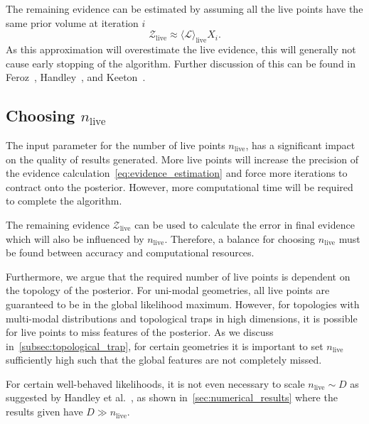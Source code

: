 \documentclass[11pt]{article}
\begin{document}
    The remaining evidence can be estimated by assuming all the live points have the same prior volume at iteration $i$
    \begin{equation}\label{eq:remaining_evidence}
    \mathcal{Z}_{\text{live}} \approx \langle \mathcal{L} \rangle_{\text{live}} X_i.
    \end{equation}
    As this approximation will overestimate the live evidence, this will generally not cause early stopping of the algorithm.
    Further discussion of this can be found in Feroz~\cite{Feroz_2009}, Handley~\cite{Handley_2015}, and
    Keeton~\cite{keeton2011statistical}.

    \subsection{Choosing $n_{\text{live}}$}\label{subsec:ns_termination}
    The input parameter for the number of live points $n_{\text{live}}$, has a significant impact on the quality of results generated.
    More live points will increase the precision of the evidence calculation~\eqref{eq:evidence_estimation} and force more
    iterations to contract onto the posterior.
    However, more computational time will be required to complete the algorithm.

    The remaining evidence $\mathcal{Z}_{\text{live}}$ can be used to calculate the error in final
    evidence~\cite{keeton2011statistical, Handley_2015} which will also be influenced by $n_{\text{live}}$.
    Therefore, a balance for choosing $n_{\text{live}}$ must be found between accuracy and computational resources.

    Furthermore, we argue that the required number of live points is dependent on the topology of the posterior.
    For uni-modal geometries, all live points are guaranteed to be in the global likelihood maximum.
    However, for topologies with multi-modal distributions and topological traps in high dimensions,
    it is possible for live points to miss features of the posterior.
    As we discuss in~\cref{subsec:topological_trap}, for certain geometries it is important to
    set $n_{\text{live}}$ sufficiently high such that the global features are not completely missed.

    For certain well-behaved likelihoods, it is not even necessary to scale $n_{\text{live}} \sim D$ as suggested by
    Handley et al.~\cite{Handley_2015}, as shown in~\cref{sec:numerical_results} where the results given
    have $D \gg n_{\text{live}}$.
\end{document}
